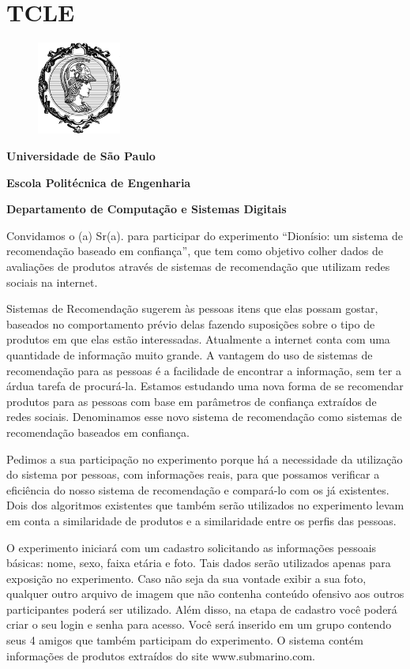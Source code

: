 \appendix
\chapter {TCLE}

\begin{figure}[ht]
  \centering
  \includegraphics[width=2.76cm]{imagens/minerva.png}
\end{figure}
\centerline{\textbf{Universidade de São Paulo}}
\centerline{\textbf{Escola Politécnica de Engenharia}}
\centerline{\textbf{Departamento de Computação e Sistemas Digitais}}
\vspace{0.3in}
 Convidamos o (a) Sr(a). para participar do experimento “Dionísio: um sistema de recomendação baseado em confiança”, que tem como objetivo colher dados de avaliações de produtos através de sistemas de recomendação que utilizam redes sociais na internet.

 Sistemas de Recomendação sugerem às pessoas itens que elas possam gostar, baseados no comportamento prévio delas fazendo suposições sobre o tipo de produtos em que elas estão interessadas. Atualmente a internet conta com uma quantidade de informação muito grande. A vantagem do uso de sistemas de recomendação para as pessoas é a facilidade de encontrar a informação, sem ter a árdua tarefa de procurá-la. Estamos estudando uma nova forma de se recomendar produtos para as pessoas com base em parâmetros de confiança extraídos de redes sociais. Denominamos esse novo sistema de recomendação como sistemas de recomendação baseados em confiança.
	
 Pedimos a sua participação no experimento porque há a necessidade da utilização do sistema por pessoas, com informações reais, para que possamos verificar a eficiência do nosso sistema de recomendação e compará-lo com os já existentes. Dois dos algoritmos existentes que também serão utilizados no experimento levam em conta a similaridade de produtos e a similaridade entre os perfis das pessoas.

 O experimento iniciará com um cadastro solicitando as informações pessoais básicas: nome, sexo, faixa etária e foto. Tais dados serão utilizados apenas para exposição no experimento. Caso não seja da sua vontade exibir a sua foto, qualquer outro arquivo de imagem que não contenha conteúdo ofensivo aos outros participantes poderá ser utilizado. Além disso, na etapa de cadastro você poderá criar o seu login e senha para acesso. Você será inserido em um grupo contendo seus 4 amigos que também participam do experimento. O sistema contém informações de produtos extraídos do site www.submarino.com.

